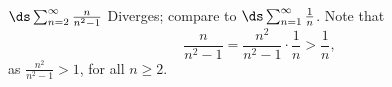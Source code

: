 {$\ds \sum_{n=2}^\infty \frac{n}{n^2-1}$
}
{Diverges; compare to $\ds \sum_{n=1}^\infty \frac 1n$. Note that 
$$\frac{n}{n^2-1} = \frac{n^2}{n^2-1}\cdot\frac1n > \frac 1n,$$ as $\frac{n^2}{n^2-1}>1$, for all $n\geq 2$.
}